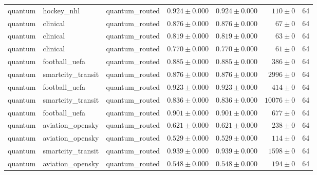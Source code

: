 \begin{table}[htbp]
\begin{tabular}{l l l r r r r}
quantum & hockey\_nhl & quantum\_routed & $0.924\pm0.000$ & $0.924\pm0.000$ & $110\pm0$ & 64 \\
quantum & clinical & quantum\_routed & $0.876\pm0.000$ & $0.876\pm0.000$ & $67\pm0$ & 64 \\
quantum & clinical & quantum\_routed & $0.819\pm0.000$ & $0.819\pm0.000$ & $63\pm0$ & 64 \\
quantum & clinical & quantum\_routed & $0.770\pm0.000$ & $0.770\pm0.000$ & $61\pm0$ & 64 \\
quantum & football\_uefa & quantum\_routed & $0.885\pm0.000$ & $0.885\pm0.000$ & $386\pm0$ & 64 \\
quantum & smartcity\_transit & quantum\_routed & $0.876\pm0.000$ & $0.876\pm0.000$ & $2996\pm0$ & 64 \\
quantum & football\_uefa & quantum\_routed & $0.923\pm0.000$ & $0.923\pm0.000$ & $414\pm0$ & 64 \\
quantum & smartcity\_transit & quantum\_routed & $0.836\pm0.000$ & $0.836\pm0.000$ & $10076\pm0$ & 64 \\
quantum & football\_uefa & quantum\_routed & $0.901\pm0.000$ & $0.901\pm0.000$ & $677\pm0$ & 64 \\
quantum & aviation\_opensky & quantum\_routed & $0.621\pm0.000$ & $0.621\pm0.000$ & $238\pm0$ & 64 \\
quantum & aviation\_opensky & quantum\_routed & $0.529\pm0.000$ & $0.529\pm0.000$ & $114\pm0$ & 64 \\
quantum & smartcity\_transit & quantum\_routed & $0.939\pm0.000$ & $0.939\pm0.000$ & $1598\pm0$ & 64 \\
quantum & aviation\_opensky & quantum\_routed & $0.548\pm0.000$ & $0.548\pm0.000$ & $194\pm0$ & 64 \\
\hline
\end{tabular}
\end{table}

